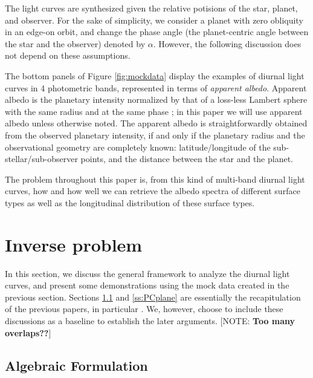 \documentclass[iop,numberedappendix,apj,]{emulateapj}
\def\memoYF#1{\color{red}[NOTE: {\bf #1}]\color{black}}
\begin{document}
The light curves are synthesized given the relative potisions of the star, planet, and observer.  
For the sake of simplicity, we consider a planet with zero obliquity in an edge-on orbit, and change the phase angle (the planet-centric angle between the star and the observer) denoted by $\alpha $. 
However, the following discussion does not depend on these assumptions. 

The bottom panels of Figure \ref{fig:mockdata} display the examples of diurnal light curves in 4 photometric bands, represented in terms of {\it apparent albedo}. 
Apparent albedo is the planetary intensity normalized by that of a loss-less Lambert sphere with the same radius and at the same phase \citep{Qiu2003, Seager2010}; in this paper we will use apparent albedo unless otherwise noted. 
The apparent albedo is straightforwardly obtained from the observed planetary intensity, if and only if the planetary radius and the observational geometry are completely known: latitude/longitude of the sub-stellar/sub-observer points, and the distance between the star and the planet. 

The problem throughout this paper is, from this kind of multi-band diurnal light curves, how and how well we can retrieve the albedo spectra of different surface types as well as the longitudinal distribution of these surface types. 


\section{Inverse problem}
\label{s:frame}

In this section, we discuss the general framework to analyze the diurnal light curves, and present some demonstrations using the mock data created in the previous section. 
Sections \ref{ss:model} and \ref{ss:PCplane} are essentially the recapitulation of the previous papers, in particular \citet{Cowan2013} \citep[but see also][]{Cowan2009,Cowan2011,Fujii2010,Fujii2011}.  
We, however, choose to include these discussions as a baseline to establish the later arguments. 
\memoYF{Too many overlaps??}

\subsection{Algebraic Formulation}
\label{ss:model}
\end{document}
